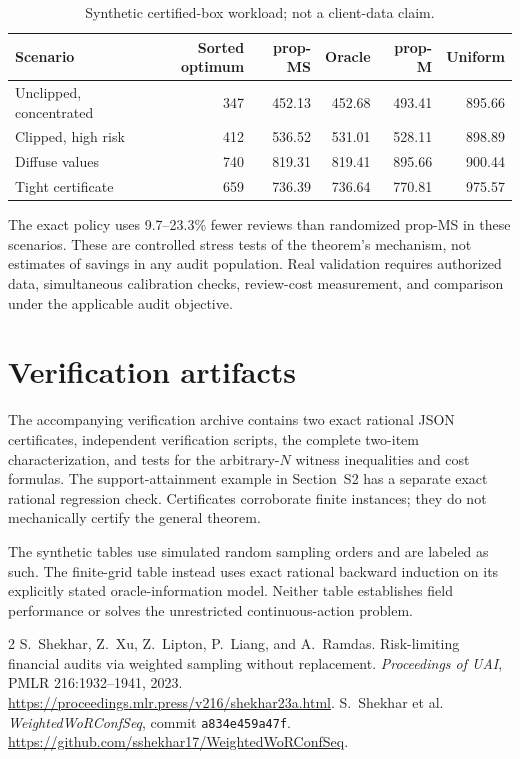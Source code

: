 \documentclass[11pt]{article}
\begin{document}
\begin{table}[t]
\centering
\small
\caption{Synthetic certified-box workload; not a client-data claim.}
\label{tab:synthetic}
\begin{tabular}{lrrrrr}
\toprule
Scenario & Sorted optimum & prop-MS & Oracle & prop-M & Uniform\\
\midrule
Unclipped, concentrated & 347 & 452.13 & 452.68 & 493.41 & 895.66\\
Clipped, high risk & 412 & 536.52 & 531.01 & 528.11 & 898.89\\
Diffuse values & 740 & 819.31 & 819.41 & 895.66 & 900.44\\
Tight certificate & 659 & 736.39 & 736.64 & 770.81 & 975.57\\
\bottomrule
\end{tabular}
\end{table}

The exact policy uses 9.7--23.3\% fewer reviews than randomized prop-MS in
these scenarios. These are controlled stress tests of the theorem's mechanism,
not estimates of savings in any audit population. Real validation requires
authorized data, simultaneous calibration checks, review-cost measurement,
and comparison under the applicable audit objective.

\section{Verification artifacts}
The accompanying verification archive contains two exact rational JSON
certificates, independent verification scripts, the complete two-item
characterization, and tests for the arbitrary-$N$ witness inequalities and
cost formulas. The support-attainment example in Section~S2 has a separate
exact rational regression check. Certificates corroborate finite instances;
they do not mechanically certify the general theorem.

The synthetic tables use simulated random sampling orders and are labeled as
such. The finite-grid table instead uses exact rational backward induction
on its explicitly stated oracle-information model. Neither table establishes
field performance or solves the unrestricted continuous-action problem.

\begingroup\small\raggedright
\begin{thebibliography}{2}
S.~Shekhar, Z.~Xu, Z.~Lipton, P.~Liang, and A.~Ramdas.
Risk-limiting financial audits via weighted sampling without replacement.
\emph{Proceedings of UAI}, PMLR 216:1932--1941, 2023.
\url{https://proceedings.mlr.press/v216/shekhar23a.html}.
S.~Shekhar et al. \emph{WeightedWoRConfSeq}, commit \texttt{a834e459a47f}.
\url{https://github.com/sshekhar17/WeightedWoRConfSeq}.
\end{thebibliography}
\endgroup
\end{document}
